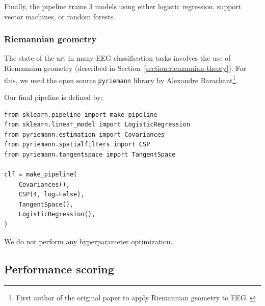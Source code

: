             Finally, the pipeline trains 3 models using either logistic regression, support vector machines, or random forests.

        \subsubsection{Riemannian geometry}

            The state of the art in many EEG classification tasks involves the use of Riemannian geometry (described in Section~\ref{section:riemannian-theory}). For this, we used the open source \texttt{pyriemann} library by Alexandre Barachant\footnote{First author of the original paper to apply Riemannian geometry to EEG~\cite{barachant_classification_2013}}.

            Our final pipeline is defined by:

\begin{verbatim}
from sklearn.pipeline import make_pipeline
from sklearn.linear_model import LogisticRegression
from pyriemann.estimation import Covariances
from pyriemann.spatialfilters import CSP
from pyriemann.tangentspace import TangentSpace

clf = make_pipeline(
    Covariances(),
    CSP(4, log=False),
    TangentSpace(),
    LogisticRegression(),
)
\end{verbatim}

            We do not perform any hyperparameter optimization.

    \subsection{Performance scoring}\label{section:scoring}

